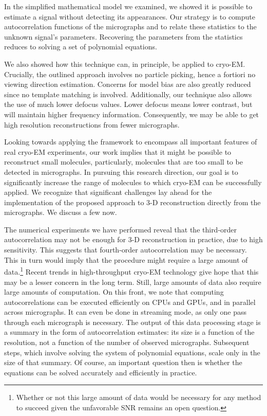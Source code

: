 \documentclass[9pt,twocolumn,twoside,lineno]{pnas-new}
\begin{document}
In the simplified mathematical model we examined, we showed it is possible to estimate a signal without detecting its appearances.  
Our strategy is to compute autocorrelation functions of the micrographs and to relate these statistics to the unknown signal's parameters. Recovering the parameters from the statistics reduces to solving a set of polynomial equations. 

We also showed how this technique can, in principle, be applied to cryo-EM.
Crucially, the outlined approach involves no particle picking, hence a fortiori no viewing direction estimation. Concerns for model bias are also greatly reduced since no template matching is involved.
Additionally,  our technique also allows the use of much lower defocus values. Lower defocus means lower contrast, but will maintain  higher frequency information. Consequently, we may be able to get high resolution reconstructions from fewer micrographs.

Looking towards applying the framework to encompass all important features of real cryo-EM experiments, our work implies that it might be possible to reconstruct small molecules, particularly, molecules that are too small to be detected in micrographs. 
In pursuing this research direction, our goal is to significantly increase the range of molecules to which cryo-EM can be successfully applied.
We recognize that significant challenges lay ahead for the implementation of the proposed approach to 3-D reconstruction directly from the micrographs. We discuss a few now.

The numerical experiments we have performed reveal that the third-order autocorrelation may not be enough for 3-D reconstruction in practice, due to high sensitivity.
This suggests that fourth-order autocorrelation may be necessary. This in turn would imply that the procedure might require a large amount of data.\footnote{Whether or not this large amount of data would be necessary for any method to succeed given the unfavorable SNR remains an open question.} Recent trends in high-throughput cryo-EM technology   give hope that this may be a lesser concern in the long term. Still, large amounts of data also require large amounts of computation. On this front, we note that computing autocorrelations can be executed efficiently on CPUs and GPUs, and in parallel across micrographs. It can even be done in streaming mode, as only one pass through each micrograph is necessary. The output of this data processing stage is a summary in the form of autocorrelation estimates: its size is a function of the resolution, not a function of the number of observed micrographs. Subsequent steps, which involve solving the system of polynomial equations, scale only in the size of that summary. Of course, an important question then is whether the equations can be solved accurately and efficiently in practice. 
\end{document}
